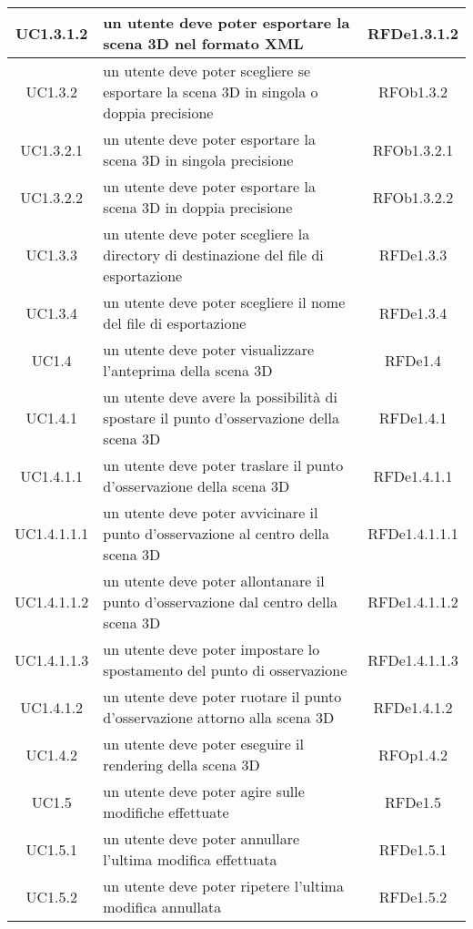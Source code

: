 \begin{longtable}{|c|p{7cm}|c|}
\midrule
UC1.3.1.2
& un utente deve poter esportare la scena 3D nel formato XML
& RFDe1.3.1.2 \\


\midrule
UC1.3.2
& un utente deve poter scegliere se esportare la scena 3D in singola o doppia precisione
& RFOb1.3.2 \\


\midrule
UC1.3.2.1
& un utente deve poter esportare la scena 3D in singola precisione
& RFOb1.3.2.1 \\


\midrule
UC1.3.2.2
& un utente deve poter esportare la scena 3D in doppia precisione
& RFOb1.3.2.2 \\


\midrule
UC1.3.3
& un utente deve poter scegliere la directory di destinazione del file di esportazione
& RFDe1.3.3 \\


\midrule
UC1.3.4
& un utente deve poter scegliere il nome del file di esportazione
& RFDe1.3.4 \\


\midrule
UC1.4
& un utente deve poter visualizzare l’anteprima della scena 3D
& RFDe1.4 \\


\midrule
UC1.4.1
& un utente deve avere la possibilità di spostare il punto d’osservazione della scena 3D
& RFDe1.4.1 \\


\midrule
UC1.4.1.1
& un utente deve poter traslare il punto d'osservazione della scena 3D
& RFDe1.4.1.1 \\


\midrule
UC1.4.1.1.1
& un utente deve poter avvicinare il punto d'osservazione al centro della scena 3D
& RFDe1.4.1.1.1 \\


\midrule
UC1.4.1.1.2
& un utente deve poter allontanare il punto d'osservazione dal centro della scena 3D
& RFDe1.4.1.1.2 \\


\midrule
UC1.4.1.1.3
& un utente deve poter impostare lo spostamento del punto di osservazione
& RFDe1.4.1.1.3 \\


\midrule
UC1.4.1.2
& un utente deve poter ruotare il punto d'osservazione attorno alla scena 3D
& RFDe1.4.1.2 \\


\midrule
UC1.4.2
& un utente deve poter eseguire il rendering della scena 3D
& RFOp1.4.2 \\


\midrule
UC1.5
& un utente deve poter agire sulle modifiche effettuate
& RFDe1.5 \\


\midrule
UC1.5.1
& un utente deve poter annullare l'ultima modifica effettuata
& RFDe1.5.1 \\


\midrule
UC1.5.2
& un utente deve poter ripetere l'ultima modifica annullata
& RFDe1.5.2 \\




\end{longtable}

